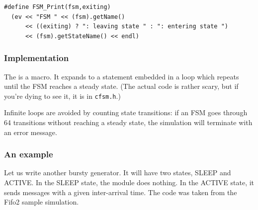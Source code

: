 \begin{verbatim}
#define FSM_Print(fsm,exiting)
  (ev << "FSM " << (fsm).getName()
      << ((exiting) ? ": leaving state " : ": entering state ")
      << (fsm).getStateName() << endl)
\end{verbatim}


\subsubsection{Implementation}


The  is a macro. It expands to a 
statement embedded in a  loop which repeats until the
FSM reaches a steady state. (The actual code is rather
scary, but if you're dying to see it, it is in \texttt{cfsm.h}.)

Infinite loops are avoided by counting state transitions: if
an FSM goes through 64 transitions without reaching a steady
state, the simulation will terminate with an error message.


\subsubsection{An example}


Let us write another bursty generator. It will have two
states, SLEEP and ACTIVE. In the SLEEP state, the module does
nothing. In the ACTIVE state, it sends messages with a given
inter-arrival time. The code was taken from the Fifo2 sample
simulation.


